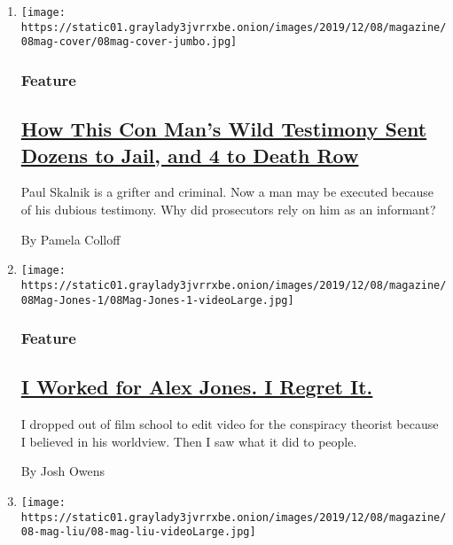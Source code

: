 \begin{enumerate}
\def\labelenumi{\arabic{enumi}.}
\item
  \texttt{[image: https://static01.graylady3jvrrxbe.onion/images/2019/12/08/magazine/08mag-cover/08mag-cover-jumbo.jpg]}

  \hypertarget{feature}{%
  \subsubsection{Feature}\label{feature}}

  \hypertarget{how-this-con-mans-wild-testimony-sent-dozens-to-jail-and-4-to-death-row}{%
  \subsection{\texorpdfstring{\href{/2019/12/04/magazine/jailhouse-informant.html}{How
  This Con Man's Wild Testimony Sent Dozens to Jail, and 4 to Death
  Row}}{How This Con Man's Wild Testimony Sent Dozens to Jail, and 4 to Death Row}}\label{how-this-con-mans-wild-testimony-sent-dozens-to-jail-and-4-to-death-row}}

  Paul Skalnik is a grifter and criminal. Now a man may be executed
  because of his dubious testimony. Why did prosecutors rely on him as
  an informant?

  By Pamela Colloff
\item
  \texttt{[image: https://static01.graylady3jvrrxbe.onion/images/2019/12/08/magazine/08Mag-Jones-1/08Mag-Jones-1-videoLarge.jpg]}

  \hypertarget{feature-1}{%
  \subsubsection{Feature}\label{feature-1}}

  \hypertarget{i-worked-for-alex-jones-i-regret-it}{%
  \subsection{\texorpdfstring{\href{/2019/12/05/magazine/alex-jones-infowars.html}{I
  Worked for Alex Jones. I Regret
  It.}}{I Worked for Alex Jones. I Regret It.}}\label{i-worked-for-alex-jones-i-regret-it}}

  I dropped out of film school to edit video for the conspiracy theorist
  because I believed in his worldview. Then I saw what it did to people.

  By Josh Owens
\item
  \texttt{[image: https://static01.graylady3jvrrxbe.onion/images/2019/12/08/magazine/08-mag-liu/08-mag-liu-videoLarge.jpg]}


\end{enumerate}
